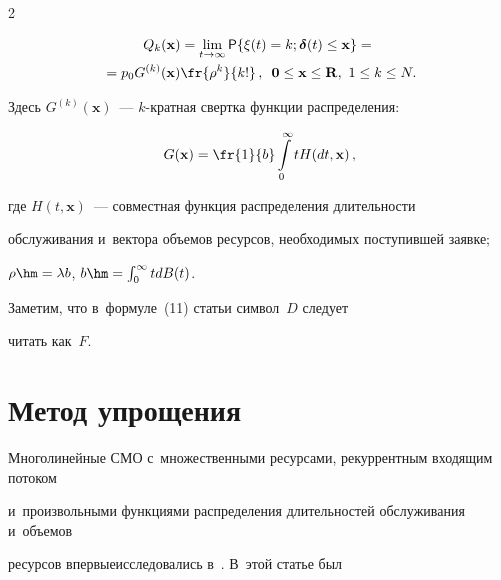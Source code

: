 \begin{multicols}{2}
\vspace*{-12pt}





\noindent


\begin{multline*}


Q_k(\mathbf{x})=\lim\limits_{t\rightarrow \infty}{\sf P}\{ \xi(t)=k; 


\boldsymbol{\delta}(t)\leq \mathbf{x}\}={}\\


{}= p_0G^{(k)}(\mathbf{x}) 


\fr{\rho^{k}}{k!}\,,\enskip \mathbf{0}\leq \mathbf{x} \leq \mathbf{R},\


1\leq k \leq N.


\end{multline*}


Здесь $G^{(k)}(\mathbf{x})$~--- $k$-крат\-ная свертка функции распределения:


\begin{equation*}


G(\mathbf{x})=\fr{1}{b}\int\limits_{0}^{\infty}tH(dt,\mathbf{x})\,,


\end{equation*}


где $H(t,\mathbf{x})$~--- совместная функция распределения длительности 


обслуживания и~вектора объемов ресурсов, необходимых поступившей заявке; 


$\rho\hm=\lambda b$, $b\hm=\int\nolimits_{0}^{\infty}tdB(t)$.


Заметим, что в~формуле~(11) \mbox{статьи} \cite{Naumov_18_2016} символ~$D$ следует 


читать как~$F$.





\section{Метод упрощения}





Многолинейные СМО с~множественными ресурсами, рекуррентным входящим потоком 


и~произвольными функциями распределения длительностей обслуживания и~объемов 


ресурсов впервые\linebreak исследовались в~\cite{Naumov_1_2014}. В~этой статье был 



\end{multicols}
